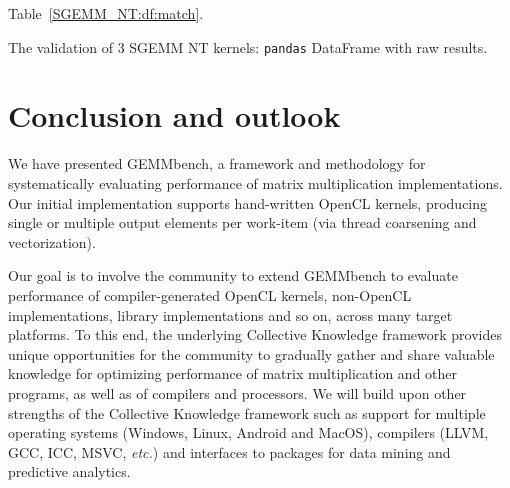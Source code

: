 \documentclass{acm_proc_article-sp} %
\begin{document}
Table~\ref{SGEMM_NT:df:match}.

\begin{sidewaystable*}
  \centering
  \caption{\label{SGEMM_NT:df:match}The validation of 3 SGEMM NT kernels: {\tt pandas} DataFrame with raw results.}
  
\end{sidewaystable*}

%



\section{Conclusion and outlook}

We have presented GEMMbench, a framework and methodology for systematically
evaluating performance of matrix multiplication implementations.
%
Our initial implementation supports hand-written OpenCL kernels, producing
single or multiple output elements per work-item (via thread coarsening and
vectorization).
%

Our goal is to involve the community to extend GEMMbench to evaluate
performance of compiler-generated OpenCL kernels, non-OpenCL implementations,
library implementations and so on, across many target platforms.
%
To this end, the underlying Collective Knowledge framework provides unique
opportunities for the community to gradually gather and share valuable
knowledge for optimizing performance of matrix multiplication and other
programs, as well as of compilers and processors.
%
We will build upon other strengths of the Collective Knowledge framework such
as support for multiple operating systems (Windows, Linux, Android and MacOS),
compilers (LLVM, GCC, ICC, MSVC, {\em etc.}) and interfaces to packages for
data mining and predictive analytics.
\end{document}
